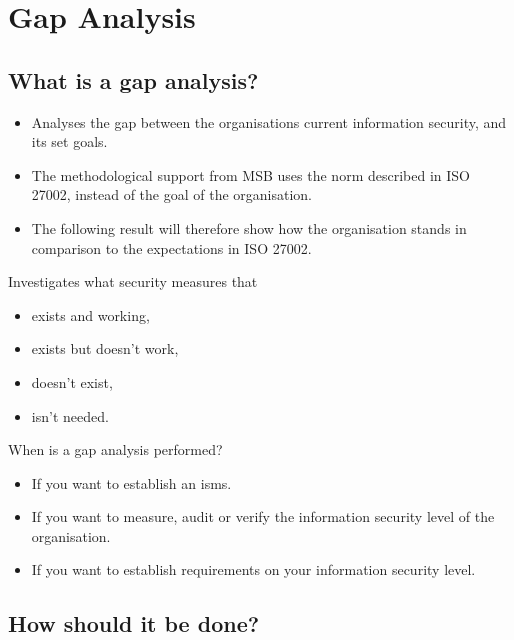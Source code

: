 \documentclass{beamer}
\begin{document}
\section{Gap Analysis}

\subsection{What is a gap analysis?}

\begin{frame}
  \begin{itemize}
    \item Analyses the gap between the organisations current information
      security, and its set goals.
    \item The methodological support from MSB uses the norm described in ISO
      27002, instead of the goal of the organisation.
    \item The following result will therefore show how the organisation stands
      in comparison to the expectations in ISO 27002.
  \end{itemize}
\end{frame}

\begin{frame}
  Investigates what security measures that
  \begin{itemize}
    \item exists and working,
    \item exists but doesn't work,
    \item doesn't exist,
    \item isn't needed.
  \end{itemize}
\end{frame}

\begin{frame}{When is a gap analysis performed?}
  \begin{itemize}
    \item If you want to establish an \ac{isms}\@.
    \item If you want to measure, audit or verify the information security level
      of the organisation.
    \item If you want to establish requirements on your information security
      level.
  \end{itemize}
\end{frame}

\subsection{How should it be done?}
\end{document}
